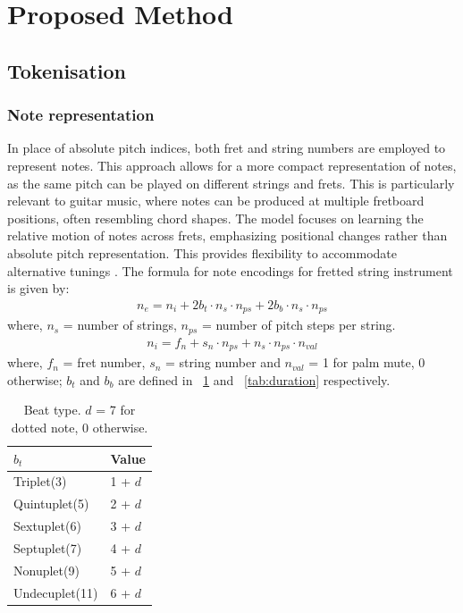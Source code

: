 \documentclass{article}
\begin{document}
\section{Proposed Method}\label{sec:proposedmethod}

\subsection{Tokenisation}\label{sec:tokenisation}
\subsubsection{Note representation}\label{sec:note}
In place of absolute pitch indices, both fret and string numbers are employed to represent notes.  This approach allows for a more compact representation of notes, 
as the same pitch can be played on different strings and frets. This is particularly relevant to guitar music, where notes can be produced at multiple 
fretboard positions, often resembling chord shapes. The model focuses on learning the relative motion of notes across frets, emphasizing positional 
changes rather than absolute pitch representation. This provides flexibility to accommodate alternative
tunings \cite{Weissman2006GuitarTunings}. The formula for note encodings for fretted string instrument is given by: 
\begin{align}
n_e = n_i + 2b_t \cdot n_s \cdot n_{ps} + 2b_b \cdot n_s \cdot n_{ps}
\end{align}
where, $n_s$ = number of strings, $n_{ps}$ = number of pitch steps per string.
\begin{align}
n_i = f_n + s_n \cdot n_{ps} + n_s \cdot n_{ps} \cdot n_{val}
\end{align}
where, $f_n$ = fret number, $s_n$ = string number and $n_{val}$ = 1 for palm mute, 0 otherwise; $b_t$ and $b_b$ are defined in ~\ref{tab:bt} and ~\ref{tab:duration} respectively.
\begin{table}[H]
\centering
  \begin{tabular}{ll}
  \toprule
  \bfseries $b_{t}$ & \bfseries Value \\ \midrule
  Triplet(3)  & 1 + $d$          \\
  Quintuplet(5)  & 2 + $d$          \\
  Sextuplet(6)  & 3 + $d$          \\
  Septuplet(7)  & 4 + $d$          \\
  Nonuplet(9)  & 5 + $d$          \\
  Undecuplet(11)  & 6 + $d$          \\
  \bottomrule
  \end{tabular}
  \caption{Beat type. $d$ = 7 for dotted note, 0 otherwise.}
\label{tab:bt}
\end{table}
\end{document}

